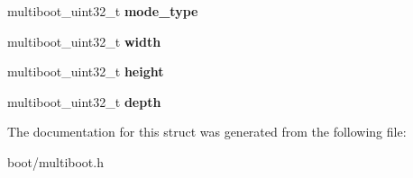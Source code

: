 \begin{DoxyCompactItemize}
\item 
\hypertarget{structmultiboot__header_a4c90b7929342dd5aab7d08afa0906d28}{
multiboot\_\-uint32\_\-t {\bfseries mode\_\-type}}
\label{structmultiboot__header_a4c90b7929342dd5aab7d08afa0906d28}

\item 
\hypertarget{structmultiboot__header_ad72a1a3dd608e73c818d0c27974def40}{
multiboot\_\-uint32\_\-t {\bfseries width}}
\label{structmultiboot__header_ad72a1a3dd608e73c818d0c27974def40}

\item 
\hypertarget{structmultiboot__header_a055c5e6553ea032897ad50a12f998a17}{
multiboot\_\-uint32\_\-t {\bfseries height}}
\label{structmultiboot__header_a055c5e6553ea032897ad50a12f998a17}

\item 
\hypertarget{structmultiboot__header_aba85b53dc3af1bf99c71292a776e9dff}{
multiboot\_\-uint32\_\-t {\bfseries depth}}
\label{structmultiboot__header_aba85b53dc3af1bf99c71292a776e9dff}

\end{DoxyCompactItemize}


The documentation for this struct was generated from the following file:\begin{DoxyCompactItemize}
\item 
boot/multiboot.h\end{DoxyCompactItemize}
